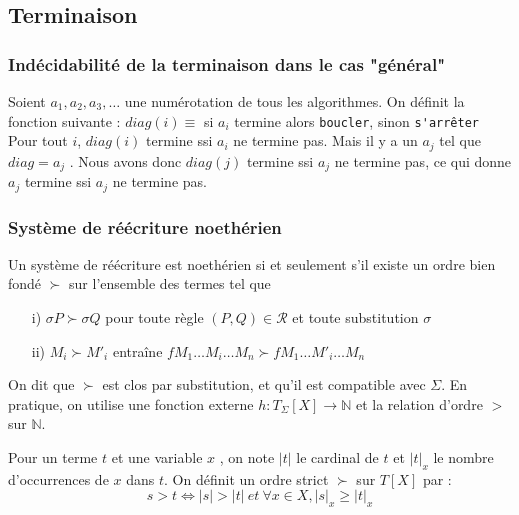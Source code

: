 \documentclass[11pt]{book}
\begin{document}
\subsection{Terminaison}
\subsubsection{Indécidabilité de la terminaison dans le cas "général"}
Soient $a_1,a_2 ,a_3 , \dots$ une numérotation de tous les algorithmes.
On définit la fonction suivante : $diag(i) ≡$ si $a_i$ termine alors \verb+boucler+, sinon \verb+s'arrêter+ \\

Pour tout $i$, $diag(i)$ termine ssi $a_i$ ne termine pas.
Mais il y a un $a_j$ tel que $diag = a_j$ . Nous avons donc
$diag(j)$ termine ssi $a_j$ ne termine pas, ce qui donne
$a_j$ termine ssi $a_j$ ne termine pas.

\subsubsection{Système de réécriture noethérien}
Un système de réécriture est noethérien si et seulement s'il existe un ordre bien fondé
$\succ$ sur l'ensemble des termes tel que
\begin{itemize}
	\item[i)] $\sigma P \succ \sigma Q$ pour toute règle $(P,Q) \in \mathcal{R}$ et toute substitution $\sigma$
	\item[ii)] $M_i \succ M'_i$ entraîne $ fM_1\dots M_i \dots M_n \succ fM_1\dots M'_i \dots M_n $
\end{itemize}

On dit que $\succ$ est clos par substitution, et qu'il est compatible avec $\Sigma$.
\vspace{0.2cm}
En pratique, on utilise une fonction externe $h : T_\Sigma [X] \rightarrow \mathbb{N} $ et la relation d'ordre $>$ sur 
$\mathbb{N}$.

Pour un terme $t$ et une variable $x$ , on note $|t|$ le cardinal de $t$ et $|t|_x$ le nombre
d'occurrences de $x$ dans $t$. On définit un ordre strict $\succ$ sur $T[X]$ par :
$$ s > t \Leftrightarrow  |s| > |t|\ et\  \forall x \in X, |s|_x ≥ |t|_x $$
\end{document}
